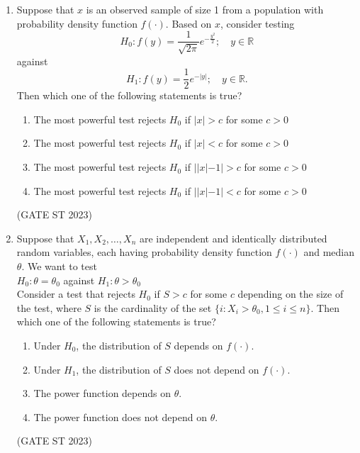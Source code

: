 \begin{enumerate}[label=\thechapter.\arabic*,ref=\thechapter.\theenumi]
\item Suppose that \(x\) is an observed sample of size 1 from a population with probability density function \(f(\cdot)\). Based on \(x\), consider testing
\[
H_0: f(y) = \frac{1}{\sqrt{2\pi}} e^{-\frac{y^2}{2}};\quad y \in \mathbb{R}
\]
against
\[
H_1: f(y) = \frac{1}{2} e^{-|y|};\quad y \in \mathbb{R}.
\]
Then which one of the following statements is true?
\begin{enumerate}
    \item The most powerful test rejects $H_0$ if $|x| > c$ for some $c > 0$ \label{eq:ST/28/2023/Option1}
    \item The most powerful test rejects $H_0$ if $|x| < c$ for some $c > 0$ \label{eq:ST/28/2023/Option2}
    \item The most powerful test rejects $H_0$ if $| |x| - 1| > c$ for some $c > 0$ \label{eq:ST/28/2023/Option3}
    \item The most powerful test rejects $H_0$ if $| |x| - 1| < c$ for some $c > 0$ \label{eq:ST/28/2023/Option4}
\end{enumerate} 
\hfill (GATE ST 2023)

\item Suppose that $X_1, X_2, \ldots, X_n$ are independent and identically distributed random variables, each having probability density function $f(\cdot)$ and median $\theta$. We want to test\\
$H_0: \theta = \theta_0$ against $H_1: \theta > \theta_0$\\
Consider a test that rejects $H_0$ if $S > c$ for some $c$ depending on the size of the test, where $S$ is the cardinality of the set $\{i : X_i > \theta_0, 1 \leq i \leq n\}$. Then which one of the following statements is true?
\begin{enumerate}
\item Under $H_0$, the distribution of $S$ depends on $f(\cdot)$.
\item Under $H_1$, the distribution of $S$ does not depend on $f(\cdot)$.
\item The power function depends on $\theta$.
\item The power function does not depend on $\theta$.
\end{enumerate}
\hfill (GATE ST 2023)

\end{enumerate}
